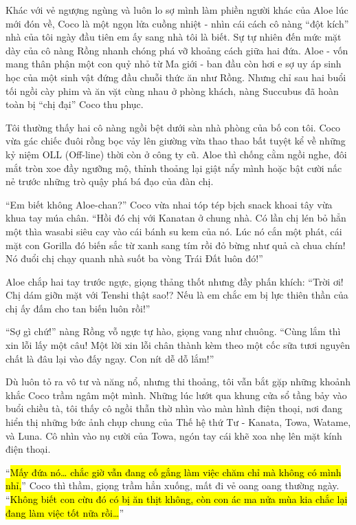 \documentclass[../main.tex]{subfiles}
\begin{document}
Khác với vẻ ngượng ngùng và luôn lo sợ mình làm phiền người khác của Aloe lúc mới đón về, Coco là một ngọn lửa cuồng nhiệt - nhìn cái cách cô nàng ``đột kích'' nhà của tôi ngày đầu tiên em ấy sang nhà tôi là biết. Sự tự nhiên đến mức mặt dày của cô nàng Rồng nhanh chóng phá vỡ khoảng cách giữa hai đứa. Aloe - vốn mang thân phận một con quỷ nhỏ từ Ma giới - ban đầu còn hơi e sợ uy áp sinh học của một sinh vật đứng đầu chuỗi thức ăn như Rồng. Nhưng chỉ sau hai buổi tối ngồi cày phim và ăn vặt cùng nhau ở phòng khách, nàng Succubus đã hoàn toàn bị ``chị đại'' Coco thu phục.

Tôi thường thấy hai cô nàng ngồi bệt dưới sàn nhà phòng của bố con tôi. Coco vừa gác chiếc đuôi rồng bọc vảy lên giường vừa thao thao bất tuyệt kể về những kỷ niệm OLL (Off-line) thời còn ở công ty cũ. Aloe thì chống cằm ngồi nghe, đôi mắt tròn xoe đầy ngưỡng mộ, thỉnh thoảng lại giật nẩy mình hoặc bật cười nấc nẻ trước những trò quậy phá bá đạo của đàn chị.

``Em biết không Aloe-chan?'' Coco vừa nhai tóp tép bịch snack khoai tây vừa khua tay múa chân. ``Hồi đó chị với Kanatan ở chung nhà. Có lần chị lén bỏ hẳn một thìa wasabi siêu cay vào cái bánh su kem của nó. Lúc nó cắn một phát, cái mặt con Gorilla đó biến sắc từ xanh sang tím rồi đỏ bừng như quả cà chua chín! Nó đuổi chị chạy quanh nhà suốt ba vòng Trái Đất luôn đó!''

Aloe chắp hai tay trước ngực, giọng thảng thốt nhưng đầy phấn khích: ``Trời ơi! Chị dám giỡn mặt với Tenshi thật sao!? Nếu là em chắc em bị lực thiên thần của chị ấy đấm cho tan biến luôn rồi!''

``Sợ gì chứ!'' nàng Rồng vỗ ngực tự hào, giọng vang như chuông. ``Cùng lắm thì xin lỗi lấy một câu! Một lời xin lỗi chân thành kèm theo một cốc sữa tươi nguyên chất là đâu lại vào đấy ngay. Con nít dễ dỗ lắm!''

Dù luôn tỏ ra vô tư và năng nổ, nhưng thi thoảng, tôi vẫn bắt gặp những khoảnh khắc Coco trầm ngâm một mình. Những lúc lướt qua khung cửa sổ tầng bảy vào buổi chiều tà, tôi thấy cô ngồi thẫn thờ nhìn vào màn hình điện thoại, nơi đang hiển thị những bức ảnh chụp chung của Thế hệ thứ Tư - Kanata, Towa, Watame, và Luna. Cô nhìn vào nụ cười của Towa, ngón tay cái khẽ xoa nhẹ lên mặt kính điện thoại.

``\hl{Mấy đứa nó\dots{} chắc giờ vẫn đang cố gắng làm việc chăm chỉ mà không có mình nhỉ,}'' Coco thì thầm, giọng trầm hẳn xuống, mất đi vẻ oang oang thường ngày. ``\hl{Không biết con cừu đó có bị ăn thịt không, còn con ác ma nửa mùa kia chắc lại đang làm việc tốt nữa rồi\dots}''
\end{document}
